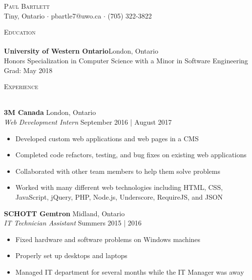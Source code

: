 \documentclass[a4paper]{article}
\newcommand{\lineunder} {
    \vspace*{-8pt} \\
    \hspace*{-18pt} \hrulefill \\
}
\newcommand{\header} [1] {
    {\hspace*{-18pt}\vspace*{6pt} \textsc{#1}}
    \vspace*{-6pt} \lineunder
}
\begin{document}
\vspace*{-40pt}

\vspace*{-10pt}
\begin{center}
	{\Huge \scshape {Paul Bartlett}}\\
	Tiny, Ontario $\cdot$ pbartle7@uwo.ca $\cdot$ (705) 322-3822\\
\end{center}

\vspace*{2mm}

\header{Education}
\textbf{University of Western Ontario}\hfill London, Ontario\\
Honors Specialization in Computer Science with a Minor in Software Engineering \hfill Grad: May 2018\\
\vspace{2mm}

\vspace*{2mm}

\header{Experience}
\vspace{1mm}

\textbf{3M Canada} \hfill London, Ontario\\
\textit{Web Development Intern} \hfill September 2016 | August 2017\\
\vspace{-1mm}
\begin{itemize} \itemsep 1pt
	\item Developed custom web applications and web pages in a CMS
	\item Completed code refactors, testing, and bug fixes on existing web applications
	\item Collaborated with other team members to help them solve problems
	\item Worked with many different web technologies including HTML, CSS, JavaScript, jQuery, PHP, Node.js, Underscore, RequireJS, and JSON
\end{itemize}

\textbf{SCHOTT Gemtron} \hfill Midland, Ontario\\
\textit{IT Technician Assistant} \hfill Summers 2015 | 2016\\
\vspace{-1mm}
\begin{itemize} \itemsep 1pt
	\item Fixed hardware and software problems on Windows machines
	\item Properly set up desktops and laptops
	\item Managed IT department for several months while the IT Manager was away
\end{itemize}
\end{document}
